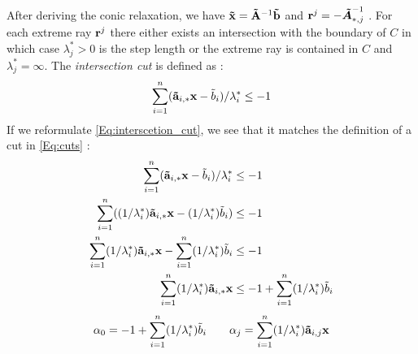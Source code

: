 After deriving the conic relaxation, we have $\bold{\tilde x} = \bold{\tilde A}^{-1} \bold{\tilde b}$ and $\bold r^j= - \boldsymbol{\tilde A}^{-1}_{*,j}$ \cite{bienstock_outer_product_free_sets}. For each extreme ray $\bold r^j$ there either exists an intersection with the boundary of $C$ in which case $\lambda^*_j > 0$ is the step length or the extreme ray is contained in $C$ and $\lambda^*_j= \infty$.
The \textit{intersection cut} is defined as \cite{bienstock_outer_product_free_sets}:
\begin{equation} \label{Eq:interscetion_cut}
    \sum_{i=1}^n (\bold{\tilde a}_{i,*} \bold x - \tilde b_i)/ \lambda_i^* \leq -1
\end{equation} 
If we reformulate \cref{Eq:interscetion_cut}, we see that it matches the definition of a cut in \cref{Eq:cuts} \cite{bienstock_outer_product_free_sets}:
\begin{align}
    \sum_{i=1}^n (\bold{\tilde a}_{i,*} \bold x - \tilde b_i)/ \lambda_i^* &\leq -1 \\
    \sum_{i=1}^n ((1/ \lambda_i^*) \bold{\tilde a}_{i,*} \bold x - (1/ \lambda_i^*)\tilde b_i) &\leq -1 \\ 
    \sum_{i=1}^n (1/ \lambda_i^*) \bold{\tilde a}_{i,*} \bold x - \sum_{i=1}^n  (1/ \lambda_i^*)\tilde b_i &\leq -1 \\
    \sum_{i=1}^n (1/ \lambda_i^*) \bold{\tilde a}_{i,*} \bold x & \leq -1 + \sum_{i=1}^n  (1/ \lambda_i^*)\tilde b_i
\end{align}
\begin{equation*}
    \alpha_0 = -1 + \sum_{i=1}^n  (1/ \lambda_i^*)\tilde b_i \quad \quad \alpha_j = \sum_{i=1}^n (1/ \lambda_i^*) \bold{\tilde a}_{i,j} \bold x
\end{equation*}



